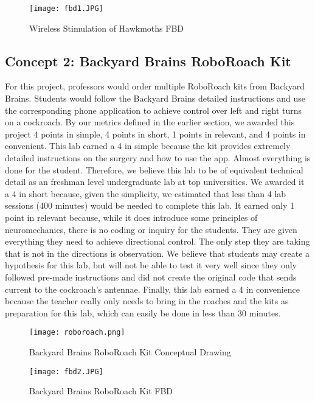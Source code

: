 \documentclass{article}
\begin{document}
\begin{figure}[ht!]
\centering
\texttt{[image: fbd1.JPG]}
\caption{Wireless Stimulation of Hawkmoths FBD}
\label{fig:FBD1}
\end{figure}

\subsection{Concept 2: Backyard Brains RoboRoach Kit}
\par For this project, professors would order multiple RoboRoach kits from Backyard Brains. Students would follow the Backyard Brains detailed instructions and use the corresponding phone application to achieve control over left and right turns on a cockroach. By our metrics defined in the earlier section, we awarded this project 4 points in simple, 4 points in short, 1 points in relevant, and 4 points in convenient. This lab earned a 4 in simple because the kit provides extremely detailed instructions on the surgery and how to use the app. Almost everything is done for the student. Therefore, we believe this lab to be of equivalent technical detail as an freshman level undergraduate lab at top universities. We awarded it a 4 in short because, given the simplicity, we estimated that less than 4 lab sessions (400 minutes) would be needed to complete this lab. It earned only 1 point in relevant because, while it does introduce some principles of neuromechanics, there is no coding or inquiry for the students. They are given everything they need to achieve directional control. The only step they are taking that is not in the directions is observation. We believe that students may create a hypothesis for this lab, but will not be able to test it very well since they only followed pre-made instructions and did not create the original code that sends current to the cockroach's antennae. Finally, this lab earned a 4 in convenience because the teacher really only needs to bring in the roaches and the kits as preparation for this lab, which can easily be done in less than 30 minutes.

\begin{figure}[ht!]
\centering
\texttt{[image: roboroach.png]}
\caption{Backyard Brains RoboRoach Kit Conceptual Drawing}
\label{fig:concept2}
\end{figure}

\begin{figure}[ht!]
\centering
\texttt{[image: fbd2.JPG]}
\caption{Backyard Brains RoboRoach Kit FBD}
\label{fig:FBD2}
\end{figure}
\end{document}
